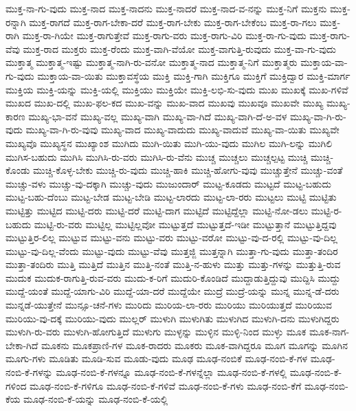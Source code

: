 {ಮುಕ್ತ-ನಾ-ಗು-ವುದು
ಮುಕ್ತ-ನಾದ
ಮುಕ್ತ-ನಾದನು
ಮುಕ್ತ-ನಾದರೆ
ಮುಕ್ತ-ನಾದ-ವ-ನನ್ನು
ಮುಕ್ತ-ನಿಗೆ
ಮುಕ್ತನು
ಮುಕ್ತ-ರನ್ನಾಗಿ
ಮುಕ್ತ-ರಾಗದೆ
ಮುಕ್ತ-ರಾಗ-ಬೇಕಾ-ದರೆ
ಮುಕ್ತ-ರಾಗ-ಬೇಕು
ಮುಕ್ತ-ರಾಗ-ಬೇಕೆಂಬ
ಮುಕ್ತ-ರಾ-ಗಲು
ಮುಕ್ತ-ರಾಗಿ
ಮುಕ್ತ-ರಾ-ಗಿಯೇ
ಮುಕ್ತ-ರಾಗುತ್ತೇವೆ
ಮುಕ್ತ-ರಾಗು-ವರು
ಮುಕ್ತ-ರಾಗು-ವಿರಿ
ಮುಕ್ತ-ರಾ-ಗು-ವುದು
ಮುಕ್ತ-ರಾಗು-ವೆವು
ಮುಕ್ತ-ರಾದ
ಮುಕ್ತರು
ಮುಕ್ತ-ರೆಂದು
ಮುಕ್ತ-ವಾಗಿ-ವೆಯೋ
ಮುಕ್ತ-ವಾಗುತ್ತಿ-ರುವುದು
ಮುಕ್ತ-ವಾ-ಗು-ವುದು
ಮುಕ್ತಾತ್ಮ
ಮುಕ್ತಾತ್ಮ-ಇಷ್ಟು
ಮುಕ್ತಾತ್ಮ-ನಾಗಿ-ರು-ವನೋ
ಮುಕ್ತಾತ್ಮ-ನಾದ
ಮುಕ್ತಾತ್ಮ-ನಿಗೆ
ಮುಕ್ತಾತ್ಮರು
ಮುಕ್ತಾಯ-ವಾ-ಗು-ವುದು
ಮುಕ್ತಾಯ-ವಾ-ಯಿತು
ಮುಕ್ತಾವಸ್ಥೆಯ
ಮುಕ್ತಿ
ಮುಕ್ತಿ-ಗಾಗಿ
ಮುಕ್ತಿಗೂ
ಮುಕ್ತಿಗೆ
ಮುಕ್ತಿದ್ವಾರ
ಮುಕ್ತಿ-ಮಾರ್ಗ
ಮುಕ್ತಿಯ
ಮುಕ್ತಿ-ಯನ್ನು
ಮುಕ್ತಿ-ಯಲ್ಲಿ
ಮುಕ್ತಿಯು
ಮುಕ್ತಿಯೇ
ಮುಕ್ತಿ-ಲಭಿ-ಸು-ವುದು
ಮುಖ
ಮುಖಕ್ಕೆ
ಮುಖ-ಗಳಿವೆ
ಮುಖದ
ಮುಖ-ದಲ್ಲಿ
ಮುಖ-ಫಲ-ಕದ
ಮುಖ-ವನ್ನು
ಮುಖ-ವಾದ
ಮುಖವು
ಮುಖವೂ
ಮುಖವೇ
ಮುಖ್ಯ
ಮುಖ್ಯ-ಕಾರಣ
ಮುಖ್ಯ-ಭಾ-ವನೆ
ಮುಖ್ಯ-ವಲ್ಲ
ಮುಖ್ಯ-ವಾಗಿ
ಮುಖ್ಯ-ವಾ-ಗಿದೆ
ಮುಖ್ಯ-ವಾಗಿ-ದೆ-ಅ-ವಳ
ಮುಖ್ಯ-ವಾ-ಗಿ-ರು-ವುದು
ಮುಖ್ಯ-ವಾ-ಗಿ-ರು-ವುವು
ಮುಖ್ಯ-ವಾದ
ಮುಖ್ಯ-ವಾದುದು
ಮುಖ್ಯ-ವಾದುವೆ
ಮುಖ್ಯ-ವಾ-ಯಿತು
ಮುಖ್ಯವೇ
ಮುಖ್ಯವೊ
ಮುಖ್ಯಸ್ಥನ
ಮುಖ್ಯಾಂಶ
ಮುಗಿದು
ಮುಗಿ-ಯಿತು
ಮುಗಿ-ಯು-ವುದು
ಮುಗಿಲ
ಮುಗಿ-ಲನ್ನು
ಮುಗಿಲಿ
ಮುಗಿಸ-ಬಹುದು
ಮುಗಿಸಿ
ಮುಗಿಸಿ-ರು-ವರು
ಮುಗಿಸಿ-ರು-ವೆನು
ಮುಚ್ಚ
ಮುಚ್ಚಲು
ಮುಚ್ಚಲ್ಪಟ್ಟ
ಮುಚ್ಚಿ
ಮುಚ್ಚಿ-ಕೊಂಡು
ಮುಚ್ಚಿ-ಕೊಳ್ಳ-ಬೇಕು
ಮುಚ್ಚಿ-ರು-ವುದು
ಮುಚ್ಚಿ-ಹಾಕಿ
ಮುಚ್ಚಿ-ಹೋಗು-ವುವು
ಮುಚ್ಚುತ್ತೇನೆ
ಮುಚ್ಚು-ವಂತೆ
ಮುಚ್ಚು-ವಳು
ಮುಚ್ಚು-ವು-ದಕ್ಕಾಗಿ
ಮುಚ್ಚು-ವುದು
ಮುಜುಂದಾರ್
ಮುಟ್ಟ-ಕೂಡದು
ಮುಟ್ಟದೆ
ಮುಟ್ಟ-ಬಹುದು
ಮುಟ್ಟ-ಬಹು-ದೆಂಬು
ಮುಟ್ಟ-ಬೇಡ
ಮುಟ್ಟ-ಬೇಡಿ
ಮುಟ್ಟ-ಲಾರದು
ಮುಟ್ಟ-ಲಾ-ರರು
ಮುಟ್ಟಲು
ಮುಟ್ಟಿ
ಮುಟ್ಟಿತು
ಮುಟ್ಟಿತ್ತು
ಮುಟ್ಟಿದ
ಮುಟ್ಟಿ-ದರು
ಮುಟ್ಟಿ-ದರೆ
ಮುಟ್ಟಿ-ದಾಗ
ಮುಟ್ಟಿದೆ
ಮುಟ್ಟಿದ್ದೆಲ್ಲಾ
ಮುಟ್ಟಿ-ನೋ-ಡಲು
ಮುಟ್ಟಿ-ರ-ಬಹುದು
ಮುಟ್ಟಿ-ರು-ವರು
ಮುಟ್ಟಿಲ್ಲ
ಮುಟ್ಟಿಲ್ಲವೋ
ಮುಟ್ಟುತ್ತದೆ
ಮುಟ್ಟುತ್ತದೆ-ಇಡೀ
ಮುಟ್ಟುತ್ತಾನೆ
ಮುಟ್ಟುತ್ತಿದ್ದವು
ಮುಟ್ಟುತ್ತಿರ-ಲಿಲ್ಲ
ಮುಟ್ಟುವ
ಮುಟ್ಟು-ವನು
ಮುಟ್ಟು-ವರು
ಮುಟ್ಟು-ವರೋ
ಮುಟ್ಟು-ವು-ದ-ರಲ್ಲಿ
ಮುಟ್ಟು-ವು-ದಿಲ್ಲ
ಮುಟ್ಟು-ವು-ದಿಲ್ಲ-ವೆಂದು
ಮುಟ್ಟು-ವುದು
ಮುಟ್ಟು-ವೆವು
ಮುತ್ತಜ್ಜಿ
ಮುತ್ತನ್ನಾಗಿ
ಮುತ್ತಾ-ಗು-ವುದು
ಮುತ್ತಾ-ತಂದಿರ
ಮುತ್ತಾ-ತಂದಿರು
ಮುತ್ತಿ
ಮುತ್ತಿದೆ
ಮುತ್ತಿನ
ಮುತ್ತಿ-ನಂತೆ
ಮುತ್ತಿ-ನ-ಹುಳು
ಮುತ್ತು
ಮುತ್ತು-ಗಳನ್ನು
ಮುತ್ತುತ್ತಿ-ರುವ
ಮುದುಕ
ಮುದುಕ-ರಾಗುತ್ತಿ-ರುವ-ವರು
ಮುದು-ಕ-ರಿಗೆ
ಮುದುರಿ-ಕೊಂಡಿದೆ
ಮುದ್ದಾಡುತ್ತಿದ್ದುವು
ಮುದ್ದಿಸಿ
ಮುದ್ದು
ಮುದ್ದೆ-ಯಂತೆ
ಮುದ್ದೆ-ಯಾಗು-ವಿರಿ
ಮುದ್ದೆ-ಯಾ-ದರೆ
ಮುದ್ದೆಯೇ
ಮುದ್ರೆ
ಮುದ್ರೆ-ಯನ್ನು
ಮುನ್ನ
ಮುನ್ನ-ಡೆ-ದರು
ಮುನ್ನಡೆ-ಯುತ್ತೇನೆ
ಮುನ್ಸೂ-ಚನೆ-ಗಳು
ಮುರಿದು
ಮುರಿಯ-ಲಾ-ರರು
ಮುರಿಯು
ಮುರಿಯುತ್ತದೆ
ಮುರಿಯುವ
ಮುರಿಯು-ವು-ದಕ್ಕೆ
ಮುರಿಯು-ವುದು
ಮುಲ್ಲರ್
ಮುಳುಗಿ
ಮುಳುಗಿತು
ಮುಳುಗಿದ
ಮುಳುಗಿ-ದನು
ಮುಳುಗಿದ್ದರು
ಮುಳುಗಿ-ರು-ವರು
ಮುಳುಗಿ-ಹೋಗುತ್ತಿದೆ
ಮುಳುಗು
ಮುಳ್ಳನ್ನು
ಮುಳ್ಳಿನ
ಮುಳ್ಳಿ-ನಿಂದ
ಮುಳ್ಳು
ಮೂಕ
ಮೂಕ-ನಾಗ-ಬೇಕಾ-ಗಿದೆ
ಮೂಕನು
ಮೂಕಪ್ರಾಣಿ-ಗಳ
ಮೂಕ-ರಾದರು
ಮೂಕರು
ಮೂಕ-ವಾಗಿದ್ದರೂ
ಮೂಗ
ಮೂಗನ್ನು
ಮೂಗಿನ
ಮೂಗು-ಗಳು
ಮೂಡಿತು
ಮೂಡಿ-ಸುವ
ಮೂಡು-ವುದು
ಮೂಢ
ಮೂಢ-ನಂಬಿಕೆ
ಮೂಢ-ನಂಬಿ-ಕೆ-ಗಳ
ಮೂಢ-ನಂಬಿ-ಕೆ-ಗಳನ್ನು
ಮೂಢ-ನಂಬಿ-ಕೆ-ಗಳನ್ನೂ
ಮೂಢ-ನಂಬಿ-ಕೆ-ಗಳನ್ನೆಲ್ಲಾ
ಮೂಢ-ನಂಬಿ-ಕೆ-ಗಳಲ್ಲಿ
ಮೂಢ-ನಂಬಿ-ಕೆ-ಗಳಿಂದ
ಮೂಢ-ನಂಬಿ-ಕೆ-ಗಳಿಗೂ
ಮೂಢ-ನಂಬಿ-ಕೆ-ಗಳಿವೆ
ಮೂಢ-ನಂಬಿ-ಕೆ-ಗಳು
ಮೂಢ-ನಂಬಿ-ಕೆಗೆ
ಮೂಢ-ನಂಬಿ-ಕೆಯ
ಮೂಢ-ನಂಬಿ-ಕೆ-ಯನ್ನು
ಮೂಢ-ನಂಬಿ-ಕೆ-ಯಲ್ಲಿ
}
